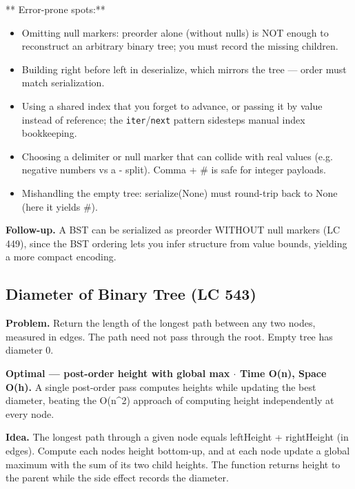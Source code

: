 \documentclass[11pt]{article}
\providecommand{\tightlist}{\setlength{\itemsep}{1pt}\setlength{\parskip}{0pt}}
\begin{document}
** Error-prone spots:**

\begin{itemize}
\tightlist
\item
  Omitting null markers: preorder alone (without nulls) is NOT enough to reconstruct an arbitrary binary tree; you must record the missing children.
\item
  Building right before left in deserialize, which mirrors the tree --- order must match serialization.
\item
  Using a shared index that you forget to advance, or passing it by value instead of reference; the \texttt{iter}/\texttt{next} pattern sidesteps manual index bookkeeping.
\item
  Choosing a delimiter or null marker that can collide with real values (e.g. negative numbers vs a \textquotesingle-\textquotesingle{} split). Comma + \textquotesingle\#\textquotesingle{} is safe for integer payloads.
\item
  Mishandling the empty tree: serialize(None) must round-trip back to None (here it yields \textquotesingle\#\textquotesingle).
\end{itemize}

\textbf{Follow-up.} A BST can be serialized as preorder WITHOUT null markers (LC 449), since the BST ordering lets you infer structure from value bounds, yielding a more compact encoding.

\subsection{Diameter of Binary Tree (LC 543)}\label{diameter-of-binary-tree-lc-543}

\textbf{Problem.} Return the length of the longest path between any two nodes, measured in edges. The path need not pass through the root. Empty tree has diameter 0.

\textbf{Optimal --- post-order height with global max \(\cdot\) Time O(n), Space O(h).} A single post-order pass computes heights while updating the best diameter, beating the O(n\^{}2) approach of computing height independently at every node.

\textbf{Idea.} The longest path through a given node equals leftHeight + rightHeight (in edges). Compute each node\textquotesingle s height bottom-up, and at each node update a global maximum with the sum of its two child heights. The function returns height to the parent while the side effect records the diameter.

\end{document}
